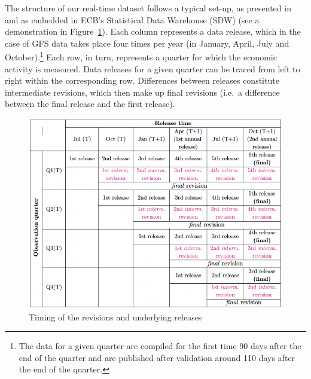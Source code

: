 \documentclass[
  letterpaper,
  authoryear,
  preprint,
  3p]{elsarticle}
\begin{document}
The structure of our real-time dataset follows a typical set-up, as
presented in \citet{diebold_rudebusch} and as embedded in ECB's
Statistical Data Warehouse (SDW) (see a demonstration in
Figure~\ref{fig-rev-chron}). Each column represents a data release,
which in the case of GFS data takes place four times per year (in
January, April, July and October).\footnote{The data for a given quarter
  are compiled for the first time 90 days after the end of the quarter
  and are published after validation around 110 days after the end of
  the quarter.} Each row, in turn, represents a quarter for which the
economic activity is measured. Data releases for a given quarter can be
traced from left to right within the corresponding row. Differences
between releases constitute intermediate revisions, which then make up
final revisions (i.e.~a difference between the final release and the
first release).

\begin{figure}[H]

{\centering \includegraphics{./rev-chron.png}

}

\caption{\label{fig-rev-chron}Timing of the revisions and underlying
releases}

\end{figure}
\end{document}
